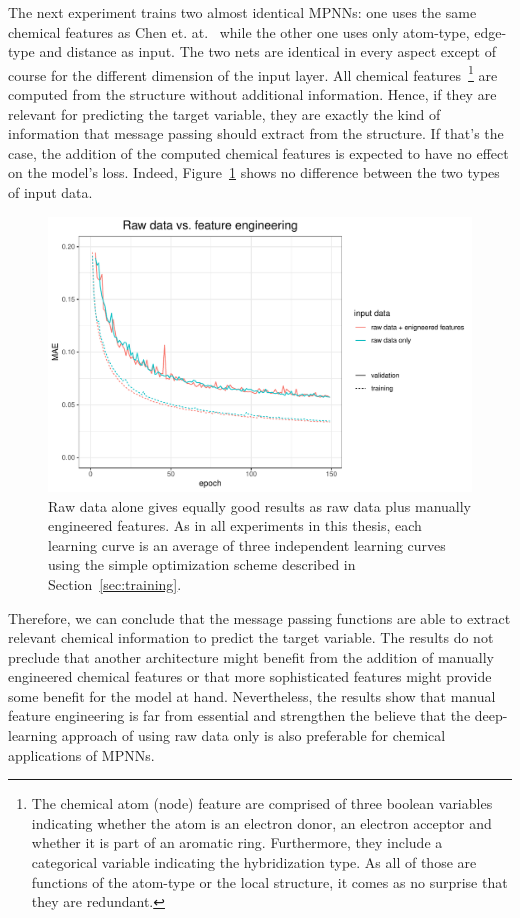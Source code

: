 The next experiment trains two almost identical MPNNs: one uses the same chemical features as Chen et. at.~\cite{Chen2019} while the other one uses only atom-type, edge-type and distance as input. The two nets are identical in every aspect except of course for the different dimension of the input layer. All chemical features~\footnote{
	The chemical atom (node) feature are comprised of three boolean variables indicating whether the atom is an electron donor, an electron acceptor and whether it is part of an aromatic ring. Furthermore, they include a categorical variable indicating the hybridization type. As all of those are functions of the atom-type or the local structure, it comes as no surprise that they are redundant.
	
}
are computed from the structure without additional information. Hence, if they are relevant for predicting the target variable, they are exactly the kind of information that message passing should extract from the structure. If that's the case, the addition of the computed chemical features is expected to have no effect on the model's loss. Indeed, Figure~\ref{fig:raw-data} shows no difference between the two types of input data.

\begin{figure}[H]
	\includegraphics[width=\linewidth]{figures/raw-data}
	\caption{Raw data alone gives equally good results as raw data plus manually engineered features. As in all experiments in this thesis, each learning curve is an average of three independent learning curves using the simple optimization scheme described in Section~\ref{sec:training}.}
	\label{fig:raw-data}
\end{figure}

Therefore, we can conclude that the message passing functions are able to extract relevant chemical information to predict the target variable. The results do not preclude that another architecture might benefit from the addition of manually engineered chemical features or that more sophisticated features might provide some benefit for the model at hand. Nevertheless, the results show that manual feature engineering is far from essential and strengthen the believe that the deep-learning approach of using raw data only is also preferable for chemical applications of MPNNs.

